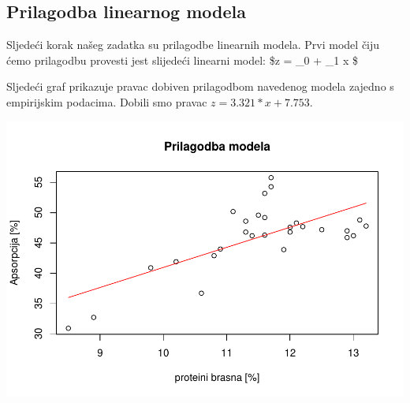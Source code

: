 \documentclass[]{article}
\newenvironment{Shaded}{\begin{snugshade}}{\end{snugshade}}
\newcommand{\KeywordTok}[1]{\textcolor[rgb]{0.13,0.29,0.53}{\textbf{{#1}}}}
\newcommand{\DataTypeTok}[1]{\textcolor[rgb]{0.13,0.29,0.53}{{#1}}}
\newcommand{\StringTok}[1]{\textcolor[rgb]{0.31,0.60,0.02}{{#1}}}
\newcommand{\NormalTok}[1]{{#1}}
\begin{document}
\subsection{Prilagodba linearnog
modela}\label{prilagodba-linearnog-modela}

Sljedeći korak našeg zadatka su prilagodbe linearnih modela. Prvi model
čiju ćemo prilagodbu provesti jest slijedeći linearni model: \$z =
\alpha\_0 + \alpha\_1 x \$

\begin{Shaded}
\end{Shaded}

Sljedeći graf prikazuje pravac dobiven prilagodbom navedenog modela
zajedno s empirijskim podacima. Dobili smo pravac
\(z = 3.321*x + 7.753\).

\begin{Shaded}
\end{Shaded}

\includegraphics{Izvjestaj_files/figure-latex/unnamed-chunk-29-1.pdf}
\end{document}
